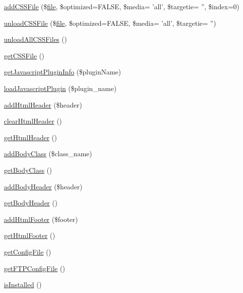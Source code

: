 \begin{DoxyCompactItemize}
\item 
\hyperlink{classContext_ac024e3744d631bf487ded23c2c6c7e24}{add\+C\+S\+S\+File} (\$\hyperlink{classfile}{file}, \$optimized=F\+A\+L\+S\+E, \$media= 'all', \$targetie= '', \$index=0)
\item 
\hyperlink{classContext_aa8ef9bdf406752ca2f6a9746e239eb4e}{unload\+C\+S\+S\+File} (\$\hyperlink{classfile}{file}, \$optimized=F\+A\+L\+S\+E, \$media= 'all', \$targetie= '')
\item 
\hyperlink{classContext_a9eb05677aeb2e95029a10919ffc6053f}{unload\+All\+C\+S\+S\+Files} ()
\item 
\hyperlink{classContext_a1b14cb135e24cc9c79414a50575cf309}{get\+C\+S\+S\+File} ()
\item 
\hyperlink{classContext_abf616bb3259e090c6e85b3aa1b581b60}{get\+Javascript\+Plugin\+Info} (\$plugin\+Name)
\item 
\hyperlink{classContext_acaea76bdc1334df9c2f088103d619593}{load\+Javascript\+Plugin} (\$plugin\+\_\+name)
\item 
\hyperlink{classContext_a26a1aea944ae54bb826500f544a67950}{add\+Html\+Header} (\$header)
\item 
\hyperlink{classContext_a5f0332b30b4ad65c0374ebd848c1dd98}{clear\+Html\+Header} ()
\item 
\hyperlink{classContext_a302e4b5d868e7a5c8bee216f774ca244}{get\+Html\+Header} ()
\item 
\hyperlink{classContext_ad266c6556167746e9368c4b1a7f6b16b}{add\+Body\+Class} (\$class\+\_\+name)
\item 
\hyperlink{classContext_a6562a2a894b2142362640e512bcf4e09}{get\+Body\+Class} ()
\item 
\hyperlink{classContext_ae7c9dad9ccd3e410283e21c67f395114}{add\+Body\+Header} (\$header)
\item 
\hyperlink{classContext_a991c9fc6985b78d817b6771092913975}{get\+Body\+Header} ()
\item 
\hyperlink{classContext_aa81925b1cc7e991c1c798e739fe048a4}{add\+Html\+Footer} (\$footer)
\item 
\hyperlink{classContext_ae7bb6879f84366eea76da3a7bf6a40bd}{get\+Html\+Footer} ()
\item 
\hyperlink{classContext_a7ac0928e07cfc7f19f9a7341c50b4811}{get\+Config\+File} ()
\item 
\hyperlink{classContext_ab7bb799f55be29174c8a15659dab823a}{get\+F\+T\+P\+Config\+File} ()
\item 
\hyperlink{classContext_a5a8714e3a0f9d4722a31ce73017c6613}{is\+Installed} ()

\end{DoxyCompactItemize}
